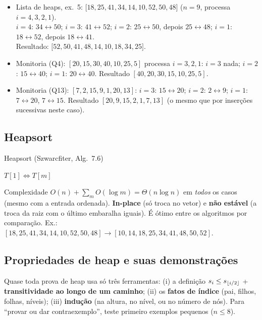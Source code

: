 \begin{exemplo}\leavevmode
\begin{itemize}
  \item Lista de heaps, ex.\ 5: $[18,25,41,34,$\allowbreak$14,10,52,50,48]$ ($n=9$, processa $i=4,3,2,1$).\\
  $i=4$: $34\leftrightarrow50$; $i=3$: $41\leftrightarrow52$; $i=2$: $25\leftrightarrow50$, depois $25\leftrightarrow48$; $i=1$: $18\leftrightarrow52$, depois $18\leftrightarrow41$.\\
  Resultado: $[52,50,41,48,$\allowbreak$14,10,18,34,25]$.
  \item Monitoria (Q4): $[20,15,30,40,10,25,5]$ processa $i=3,2,1$: $i=3$ nada; $i=2$: $15\leftrightarrow40$; $i=1$: $20\leftrightarrow40$. Resultado $[40,20,30,15,10,25,5]$.
  \item Monitoria (Q13): $[7,2,15,9,1,20,13]$: $i=3$: $15\leftrightarrow20$; $i=2$: $2\leftrightarrow9$; $i=1$: $7\leftrightarrow20$, $7\leftrightarrow15$. Resultado $[20,9,15,2,1,7,13]$ (o mesmo que por inserções sucessivas neste caso).
\end{itemize}
\end{exemplo}

\subsection{Heapsort}
\begin{pseudo}{Heapsort (Szwarcfiter, Alg.\ 7.6)}
\begin{algorithmic}
  \State {} 
    \State $T[1]\Leftrightarrow T[m]$ 
    \State {} 
  \EndFor
\EndProcedure
\end{algorithmic}
\end{pseudo}
Complexidade $O(n)+\sum_{m}O(\log m)=\Theta(n\log n)$ em \emph{todos} os casos (mesmo com a entrada ordenada). \textbf{In-place} (só troca no vetor) e \textbf{não estável} (a troca da raiz com o último embaralha iguais). É ótimo entre os algoritmos por comparação. Ex.: $[18,25,41,34,14,10,52,50,48]\to[10,14,18,25,34,41,48,50,52]$.

\subsection{Propriedades de heap e suas demonstrações}\label{sec:heapprops}
\begin{prova}
Quase toda prova de heap usa só três ferramentas: (i) a definição $s_i\le s_{\lfloor i/2\rfloor}$ + \textbf{transitividade ao longo de um caminho}; (ii) os \textbf{fatos de índice} (pai, filhos, folhas, níveis); (iii) \textbf{indução} (na altura, no nível, ou no número de nós). Para ``provar ou dar contraexemplo'', teste primeiro exemplos pequenos ($n\le 8$).
\end{prova}

